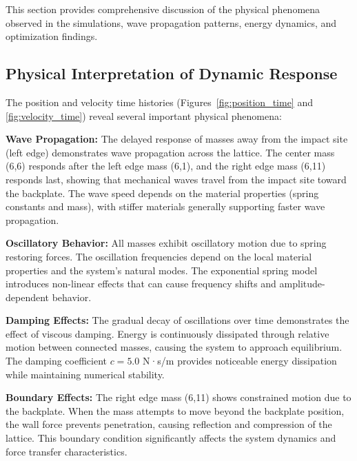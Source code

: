 \documentclass[11pt,a4paper]{article}
\begin{document}
\noindent This section provides comprehensive discussion of the physical phenomena observed in the simulations, wave propagation patterns, energy dynamics, and optimization findings.

\subsection{Physical Interpretation of Dynamic Response}

\noindent The position and velocity time histories (Figures~\ref{fig:position_time} and \ref{fig:velocity_time}) reveal several important physical phenomena: \newline

\noindent \textbf{Wave Propagation:} The delayed response of masses away from the impact site (left edge) demonstrates wave propagation across the lattice. The center mass (6,6) responds after the left edge mass (6,1), and the right edge mass (6,11) responds last, showing that mechanical waves travel from the impact site toward the backplate. The wave speed depends on the material properties (spring constants and mass), with stiffer materials generally supporting faster wave propagation. \newline

\noindent \textbf{Oscillatory Behavior:} All masses exhibit oscillatory motion due to spring restoring forces. The oscillation frequencies depend on the local material properties and the system's natural modes. The exponential spring model introduces non-linear effects that can cause frequency shifts and amplitude-dependent behavior. \newline

\noindent \textbf{Damping Effects:} The gradual decay of oscillations over time demonstrates the effect of viscous damping. Energy is continuously dissipated through relative motion between connected masses, causing the system to approach equilibrium. The damping coefficient $c = 5.0$ N·s/m provides noticeable energy dissipation while maintaining numerical stability. \newline

\noindent \textbf{Boundary Effects:} The right edge mass (6,11) shows constrained motion due to the backplate. When the mass attempts to move beyond the backplate position, the wall force prevents penetration, causing reflection and compression of the lattice. This boundary condition significantly affects the system dynamics and force transfer characteristics. \newline
\end{document}
